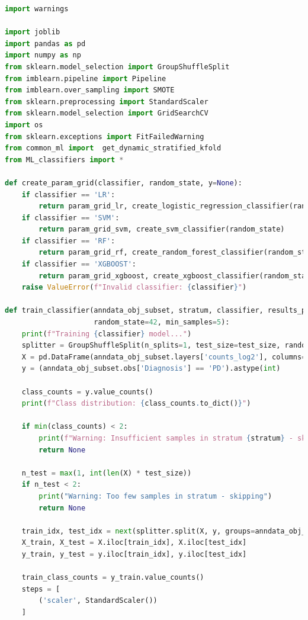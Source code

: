 \documentclass[12pt]{report}
\begin{document}
    \begin{lstlisting}[language=Python,caption={ML\_training.py: Κοινές συναρτήσεις για την εκπαίδευση κατηγοριοποιητών}, label=lst:mltrainingcommon]
    import warnings

import joblib
import pandas as pd
import numpy as np
from sklearn.model_selection import GroupShuffleSplit
from imblearn.pipeline import Pipeline
from imblearn.over_sampling import SMOTE
from sklearn.preprocessing import StandardScaler
from sklearn.model_selection import GridSearchCV
import os
from sklearn.exceptions import FitFailedWarning
from common_ml import  get_dynamic_stratified_kfold
from ML_classifiers import *

def create_param_grid(classifier, random_state, y=None):
    if classifier == 'LR':
        return param_grid_lr, create_logistic_regression_classifier(random_state)
    if classifier == 'SVM':
        return param_grid_svm, create_svm_classifier(random_state)
    if classifier == 'RF':
        return param_grid_rf, create_random_forest_classifier(random_state)
    if classifier == 'XGBOOST':
        return param_grid_xgboost, create_xgboost_classifier(random_state, y)
    raise ValueError(f"Invalid classifier: {classifier}")

def train_classifier(anndata_obj_subset, stratum, classifier, results_path, use_smote=True, test_size=0.2,
                     random_state=42, min_samples=5):
    print(f"Training {classifier} model...")
    splitter = GroupShuffleSplit(n_splits=1, test_size=test_size, random_state=random_state)
    X = pd.DataFrame(anndata_obj_subset.layers['counts_log2'], columns=anndata_obj_subset.var_names)
    y = (anndata_obj_subset.obs['Diagnosis'] == 'PD').astype(int)

    class_counts = y.value_counts()
    print(f"Class distribution: {class_counts.to_dict()}")

    if min(class_counts) < 2:
        print(f"Warning: Insufficient samples in stratum {stratum} - skipping")
        return None

    n_test = max(1, int(len(X) * test_size))
    if n_test < 2:
        print("Warning: Too few samples in stratum - skipping")
        return None

    train_idx, test_idx = next(splitter.split(X, y, groups=anndata_obj_subset.obs['Patient']))
    X_train, X_test = X.iloc[train_idx], X.iloc[test_idx]
    y_train, y_test = y.iloc[train_idx], y.iloc[test_idx]

    train_class_counts = y_train.value_counts()
    steps = [
        ('scaler', StandardScaler())
    ]


\end{lstlisting}
\end{document}
